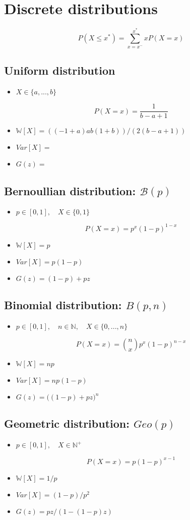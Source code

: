 \documentclass[12pt]{article}
\begin{document}
\section{Discrete distributions}
$$P(X\leq x^*)=\sum_{x=x^-}^{x^*}xP(X=x)$$
\subsection{Uniform distribution}
\begin{itemize}
	\item $X\in\{a,...,b\}$
\end{itemize}
$$P(X=x)=\frac{1}{b-a+1}$$
\begin{itemize}
	\item $\mathbb{W}[X]=((-1+a)ab(1+b))/(2(b-a+1))$
	\item $Var[X]=$
	\item $G(z)=$
\end{itemize}
\subsection{Bernoullian distribution: $\mathcal{B}(p)$}
\begin{itemize}
	\item $p\in [0,1],\quad X\in\{0,1\}$
\end{itemize}
	$$P(X=x)=p^x(1-p)^{1-x}$$
\begin{itemize}
	\item $\mathbb{W}[X]=p$
	\item $Var[X]=p(1-p)$
	\item $G(z)=(1-p)+pz$
\end{itemize}
\subsection{Binomial distribution: $B(p,n)$}
\begin{itemize}
	\item $p\in[0,1],\quad n\in \mathbb{N},\quad X\in \{0,...,n\}$
\end{itemize}
$$P(X=x)=\binom{n}{x}p^x(1-p)^{n-x}$$
\begin{itemize}
	\item $\mathbb{W}[X]=np$
	\item $Var[X]=np(1-p)$
	\item $G(z)=\big((1-p)+pz\big)^n$
\end{itemize}
\subsection{Geometric distribution: $Geo(p)$}
\begin{itemize}
	\item $p\in[0,1],\quad X\in \mathbb{N}^+$
\end{itemize}
$$P(X=x)=p(1-p)^{x-1}$$
\begin{itemize}
	\item $\mathbb{W}[X]=1/p$
	\item $Var[X]=(1-p)/p^2$
	\item $G(z)=pz/(1-(1-p)z)$
\end{itemize}
\clearpage
\end{document}
